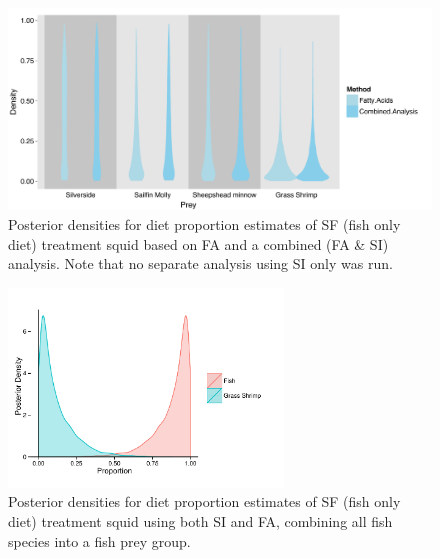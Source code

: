 \documentclass{article}%
\begin{document}
\begin{spacing}{1.9}
\begin{flushleft}
\begin{figure}
  \begin{center}
    \includegraphics[width=1\textwidth]{figures/SF_comp_plot.pdf}   
    \caption{Posterior densities for diet proportion estimates of SF
      (fish only diet) treatment squid based on FA and a combined
      (FA \& SI) analysis. Note that no separate analysis using SI
      only was run.}
    \label{fig:pop_comp_SF}
  \end{center}
\end{figure}

\begin{figure}
  \begin{center}
    \includegraphics[width=0.65\textwidth]{figures/Fish_plot.pdf}   
    \caption{Posterior densities for diet proportion estimates of SF
      (fish only diet) treatment squid using both SI and FA,
      combining all fish species into a fish prey group.}
    \label{fig:Fish_plot}
  \end{center}
\end{figure}






\end{flushleft}
\end{spacing}
\end{document}
